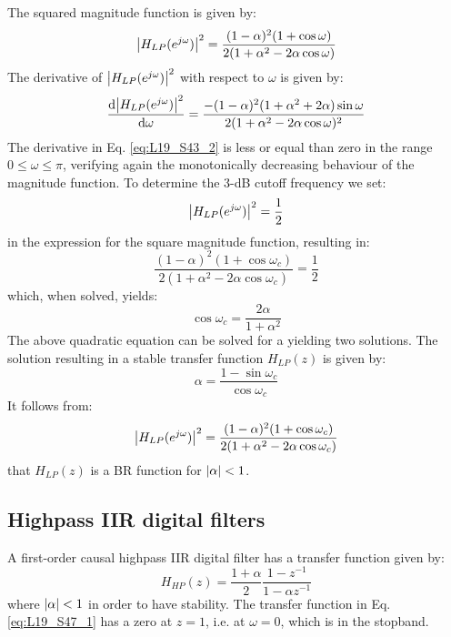 \documentclass[../../main/main.tex]{subfiles}
\begin{document}
The squared magnitude function is given by:
\begin{equation}
    \abs{H_{LP}(e^{j\omega})}^{2}
    =
    \frac{(1-\alpha)^{2}(1 + \cos\omega)}{2(1 + \alpha^{2} - 2\alpha\cos\omega)}
    \label{eq:L19_S43_1}
\end{equation}
The derivative of \( \abs{H_{LP}(e^{j\omega})}^{2} \) with respect to \( \omega \) is given by:
\begin{equation}
    \dv{\abs{H_{LP}(e^{j\omega})}^{2}}{\omega}
    =
    \frac{-(1-\alpha)^{2} (1 + \alpha^{2} + 2\alpha) \sin\omega}{2(1 + \alpha^{2} - 2\alpha\cos\omega)^{2}}
    \label{eq:L19_S43_2}
\end{equation}
The derivative in Eq. \ref{eq:L19_S43_2} is less or equal than zero in the range \( 0 \le \omega \le \pi \), verifying again the monotonically decreasing behaviour of the magnitude function. To determine the 3-dB cutoff frequency we set:
\begin{equation}
    \abs{H_{LP}(e^{j\omega})}^{2}
    =
    \frac{1}{2}
    \label{eq:L19_S44_1}
\end{equation}
in the expression for the square magnitude function, resulting in:
\begin{equation}
    \frac{(1 - \alpha)^{2}(1 + \cos\omega_{c})}{2(1 + \alpha^{2} - 2\alpha\cos\omega_{c})}
    =
    \frac{1}{2}
    \label{eq:L19_S44_2}
\end{equation}
which, when solved, yields:
\begin{equation}
    \cos\omega_{c}
    =
    \frac{2\alpha}{1 + \alpha^{2}}
    \label{eq:L19_S45_1}
\end{equation}
The above quadratic equation can be solved for a yielding two solutions. The solution resulting in a stable transfer function \( H_{LP}(z) \) is given by:
\begin{equation}
    \alpha
    =
    \frac{1 - \sin\omega_{c}}{\cos\omega_{c}}
    \label{eq:L19_S46_1}
\end{equation}
It follows from:
\begin{equation}
    \abs{H_{LP}(e^{j\omega})}^{2}
    =
    \frac{(1-\alpha)^{2}(1 + \cos\omega_{c})}{2(1 + \alpha^{2} - 2\alpha\cos\omega_{c})}
    \label{eq:L19_S46_2}
\end{equation}
that \( H_{LP}(z) \) is a BR function for \( \abs{\alpha} < 1 \).



\subsection{Highpass IIR digital filters}
A first-order causal highpass IIR digital filter has a transfer function given by:
\begin{equation}
    H_{HP}(z)
    =
    \frac{1 + \alpha}{2} \frac{1 - z^{-1}}{1 - \alpha z^{-1}}
    \label{eq:L19_S47_1}
\end{equation}
where \( \abs{\alpha} < 1 \) in order to have stability. The transfer function in Eq. \ref{eq:L19_S47_1} has a zero at \( z = 1 \), i.e. at \( \omega = 0 \), which is in the stopband.
\end{document}
